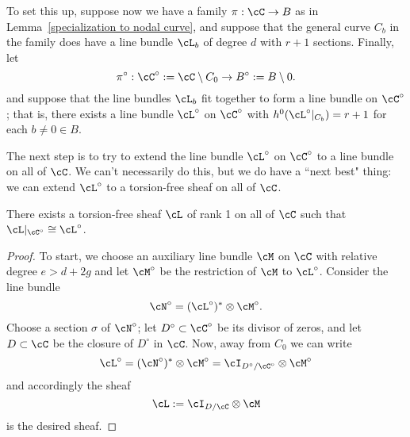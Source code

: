 To set this up, suppose now we have a family $\pi : \cC \to B$ as in Lemma~\ref{specialization to nodal curve}, and suppose that the general curve $C_b$ in the family does have a line bundle $\cL_b$ of degree $d$ with $r+1$ sections. Finally, let 
$$
\pi^\circ: \cC^\circ := \cC \setminus C_0\to B^\circ := B\setminus 0.
$$
and suppose that the line bundles $\cL_b$ fit together to form a line bundle on $\cC^\circ$; that is, there exists a line bundle $\cL^\circ$ on $\cC^\circ$ with $h^0(\cL^\circ|_{C_b}) = r+1$ for each $b \neq 0 \in B$. 

The next step is to try to extend the line bundle $\cL^\circ$ on $\cC^\circ$ to a line bundle on all of $\cC$. We can't necessarily do this, but we do have a ``next best" thing: we can extend $\cL^\circ$  to a torsion-free sheaf on all of $\cC$.



\begin{lemma}
There exists a torsion-free sheaf $\cL$ of rank 1 on all of $\cC$ such that $\cL|_{\cC^\circ} \cong \cL^\circ$.
\end{lemma}

\begin{proof} To start, we choose an auxiliary line bundle $\cM$ on $\cC$ with relative degree $e > d + 2g$ and let $\cM^\circ$ be the restriction of $\cM$ to $\cL^\circ$. Consider the line bundle 
$$
\cN^\circ = (\cL^\circ)^* \otimes \cM^\circ.
$$
Choose a section $\sigma$ of $\cN^\circ$; let $D^\circ \subset \cC^\circ$ be its divisor of zeros, and let $D \subset \cC$ be the closure of $D^\circ$ in $\cC$. Now, away from $C_0$ we can write
$$
\cL^\circ = (\cN^\circ)^* \otimes \cM^\circ = \cI_{D^\circ/\cC^\circ} \otimes \cM^\circ
$$
and accordingly the sheaf
$$
\cL := \cI_{D/\cC} \otimes \cM
$$
is the desired sheaf. 
\end{proof}

%

